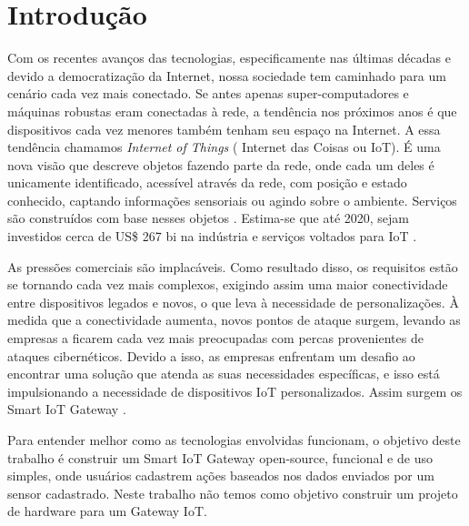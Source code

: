 \section*{Introdução}
\label{sec:intro}

Com os recentes avanços das tecnologias, especificamente nas últimas décadas e devido a democratização da Internet, nossa sociedade tem caminhado para um cenário cada vez mais conectado. Se antes apenas super-computadores e máquinas robustas eram conectadas à rede, a tendência nos próximos anos é que dispositivos cada vez menores também tenham seu espaço na Internet.
A essa tendência chamamos \textit{Internet of Things} ( Internet das Coisas ou IoT). É uma nova visão que descreve objetos fazendo parte da rede, onde cada um deles é unicamente identificado, acessível através da rede, com posição e estado conhecido, captando informações sensoriais ou agindo sobre o ambiente. Serviços são construídos com base nesses objetos \cite{ComputerWorld}. Estima-se que até 2020, sejam investidos cerca de US\$ 267 bi na indústria e serviços voltados para IoT \cite{BCGPerspectives,Forbes}.

As pressões comerciais são implacáveis. Como resultado disso, os requisitos estão se tornando cada vez mais complexos, exigindo assim uma maior conectividade entre dispositivos legados e novos, o que leva à necessidade de personalizações. À medida que a conectividade aumenta, novos pontos de ataque surgem, levando as empresas a ficarem cada vez mais preocupadas com percas provenientes de ataques cibernéticos. Devido a isso, as empresas enfrentam um desafio ao encontrar uma solução que atenda as suas necessidades específicas, e isso está impulsionando a necessidade de dispositivos IoT personalizados. Assim surgem os Smart IoT Gateway \cite{EETAsia}. 

Para entender melhor como as tecnologias envolvidas funcionam, o objetivo deste trabalho é construir um Smart IoT Gateway open-source, funcional e de uso simples, onde usuários cadastrem ações baseados nos dados enviados por um sensor cadastrado. Neste trabalho não temos como objetivo construir um projeto de hardware para um Gateway IoT.
